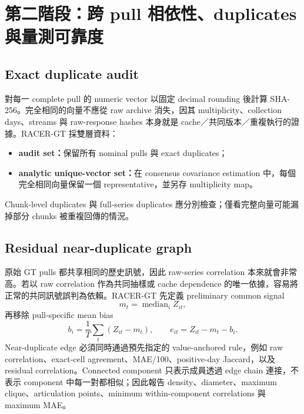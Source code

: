 \documentclass[12pt,a4paper,oneside]{article}
\begin{document}
\section{第二階段：跨 pull 相依性、duplicates 與量測可靠度}

\subsection{Exact duplicate audit}

對每一 complete pull 的 numeric vector 以固定 decimal rounding 後計算 SHA-256。完全相同的向量不應從 raw archive 消失，因其 multiplicity、collection days、streams 與 raw-response hashes 本身就是 cache／共同版本／重複執行的證據。RACER-GT 採雙層資料：
\begin{itemize}
  \item \textbf{audit set：}保留所有 nominal pulls 與 exact duplicates；
  \item \textbf{analytic unique-vector set：}在 consensus covariance estimation 中，每個完全相同向量保留一個 representative，並另存 multiplicity map。
\end{itemize}

Chunk-level duplicates 與 full-series duplicates 應分別檢查；僅看完整向量可能漏掉部分 chunks 被重複回傳的情況。

\subsection{Residual near-duplicate graph}

原始 GT pulls 都共享相同的歷史訊號，因此 raw-series correlation 本來就會非常高。若以 raw correlation 作為共同抽樣或 cache dependence 的唯一依據，容易將正常的共同訊號誤判為依賴。RACER-GT 先定義 preliminary common signal
\begin{equation}
m_t=\operatorname{median}_i Z_{it},
\end{equation}
再移除 pull-specific mean bias
\begin{equation}
b_i=\frac{1}{T}\sum_t(Z_{it}-m_t),
\qquad
e_{it}=Z_{it}-m_t-b_i.
\label{eq:residualduplicate}
\end{equation}
Near-duplicate edge 必須同時通過預先指定的 value-anchored rule，例如 raw correlation、exact-cell agreement、MAE/100、positive-day Jaccard，以及 residual correlation。Connected component 只表示成員透過 edge chain 連接，不表示 component 中每一對都相似；因此報告 density、diameter、maximum clique、articulation points、minimum within-component correlations 與 maximum MAE。
\end{document}

